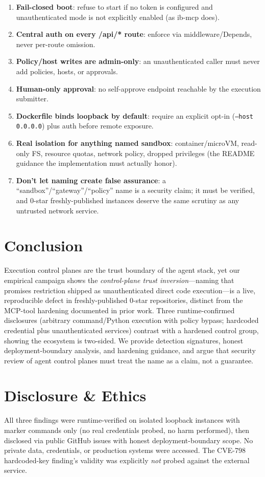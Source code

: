 \documentclass{llncs}
\begin{document}
\begin{enumerate}
    \item \textbf{Fail-closed boot}: refuse to start if no token is configured and unauthenticated mode is not explicitly enabled (as ib-mcp does).
    \item \textbf{Central auth on every /api/* route}: enforce via middleware/Depends, never per-route omission.
    \item \textbf{Policy/host writes are admin-only}: an unauthenticated caller must never add policies, hosts, or approvals.
    \item \textbf{Human-only approval}: no self-approve endpoint reachable by the execution submitter.
    \item \textbf{Dockerfile binds loopback by default}: require an explicit opt-in (\texttt{--host 0.0.0.0}) plus auth before remote exposure.
    \item \textbf{Real isolation for anything named sandbox}: container/microVM, read-only FS, resource quotas, network policy, dropped privileges (the README guidance the implementation must actually honor).
    \item \textbf{Don't let naming create false assurance}: a ``sandbox''/``gateway''/``policy'' name is a security claim; it must be verified, and 0-star freshly-published instances deserve the same scrutiny as any untrusted network service.
\end{enumerate}

\section{Conclusion}\label{sec:conclusion}
Execution control planes are the trust boundary of the agent stack, yet our empirical campaign shows the \emph{control-plane trust inversion}---naming that promises restriction shipped as unauthenticated direct code execution---is a live, reproducible defect in freshly-published 0-star repositories, distinct from the MCP-tool hardening documented in prior work. Three runtime-confirmed disclosures (arbitrary command/Python execution with policy bypass; hardcoded credential plus unauthenticated services) contrast with a hardened control group, showing the ecosystem is two-sided. We provide detection signatures, honest deployment-boundary analysis, and hardening guidance, and argue that security review of agent control planes must treat the name as a claim, not a guarantee.

\section{Disclosure \& Ethics}\label{sec:disclosure}
All three findings were runtime-verified on isolated loopback instances with marker commands only (no real credentials probed, no harm performed), then disclosed via public GitHub issues with honest deployment-boundary scope. No private data, credentials, or production systems were accessed. The CVE-798 hardcoded-key finding's validity was explicitly \emph{not} probed against the external service.



\end{document}
